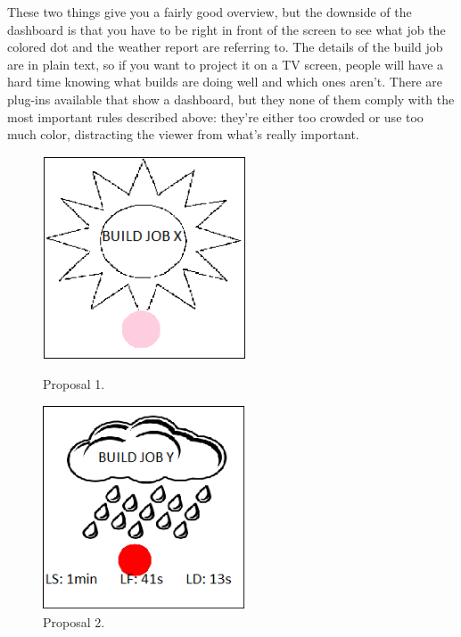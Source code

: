 \documentclass[10pt,a4paper]{article}
\begin{document}
\begin{appendices}
These two things give you a fairly good overview, but the downside of the dashboard is that you have to be right in front of the screen to see what job the colored dot and the weather report are referring to. 
The details of the build job are in plain text, so if you want to project it on a TV screen, people will have a hard time knowing what builds are doing well and which ones aren't.
There are plug-ins available that show a dashboard, but they none of them comply with the most important rules described above: they're either too crowded or use too much color, distracting the viewer from what's really important.

\begin{figure}
\centering
\begin{minipage}{0.45\textwidth}
\centering
\includegraphics[width=60mm]{prop1.png}
\caption{Proposal 1.}
\label{prop1}
\end{minipage}\hfill
\begin{minipage}{0.45\textwidth}
\centering
\includegraphics[width=60mm]{prop2.png}
\caption{Proposal 2.}
\label{prop2}
\end{minipage}
\end{figure}
  

\end{appendices}
\end{document}
